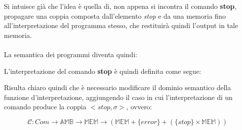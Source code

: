     Si intuisce già che l'idea è quella di, non appena si incontra il comando \textbf{stop}, propagare una coppia composta dall'elemento \textit{stop} e da una memoria fino all'interpretazione del programma stesso, che restituirà quindi l'output in tale memoria.\\
    \\
    La semantica dei programmi diventa quindi:
    
    
    L'interpretazione del comando \textbf{stop} è quindi definita come segue:
    
    
    Risulta chiaro quindi che è necessario modificare il dominio semantico della funzione d'interpretazione, aggiungendo il caso in cui l'interpretazione di un comando produce la coppia $<stop,\sigma>$, ovvero:
    
    \begin{equation*}
        \mathcal{C} : Com \rightarrow \mathbb{AMB} \rightarrow \mathbb{MEM} \rightarrow (\mathbb{MEM} + \{error\} + (\{stop\} \times \mathbb{MEM}))
    \end{equation*}
    
